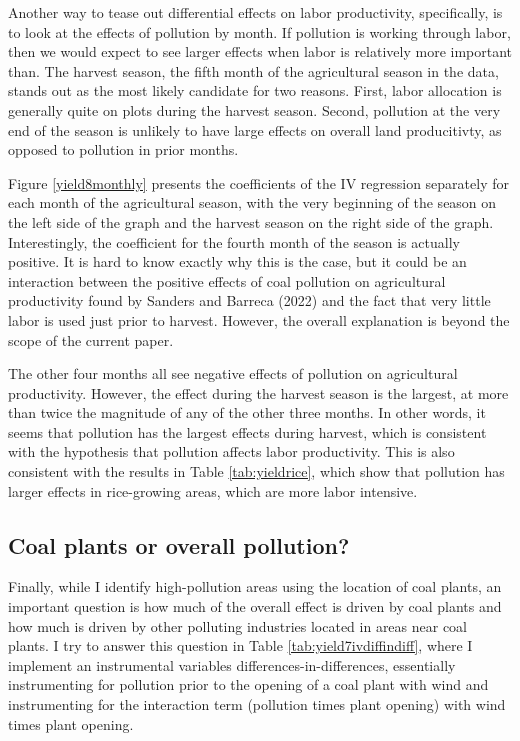 \documentclass[
]{article}
\begin{document}
Another way to tease out differential effects on labor productivity, specifically, is to look at the effects of pollution by month. If pollution is working through labor, then we would expect to see larger effects when labor is relatively more important than. The harvest season, the fifth month of the agricultural season in the data, stands out as the most likely candidate for two reasons. First, labor allocation is generally quite on plots during the harvest season. Second, pollution at the very end of the season is unlikely to have large effects on overall land producitivty, as opposed to pollution in prior months.

Figure \ref{yield8monthly} presents the coefficients of the IV regression separately for each month of the agricultural season, with the very beginning of the season on the left side of the graph and the harvest season on the right side of the graph. Interestingly, the coefficient for the fourth month of the season is actually positive. It is hard to know exactly why this is the case, but it could be an interaction between the positive effects of coal pollution on agricultural productivity found by Sanders and Barreca (2022) and the fact that very little labor is used just prior to harvest. However, the overall explanation is beyond the scope of the current paper.

The other four months all see negative effects of pollution on agricultural productivity. However, the effect during the harvest season is the largest, at more than twice the magnitude of any of the other three months. In other words, it seems that pollution has the largest effects during harvest, which is consistent with the hypothesis that pollution affects labor productivity. This is also consistent with the results in Table \ref{tab:yieldrice}, which show that pollution has larger effects in rice-growing areas, which are more labor intensive.

\hypertarget{coal-plants-or-overall-pollution}{%
\subsection{Coal plants or overall pollution?}\label{coal-plants-or-overall-pollution}}

Finally, while I identify high-pollution areas using the location of coal plants, an important question is how much of the overall effect is driven by coal plants and how much is driven by other polluting industries located in areas near coal plants. I try to answer this question in Table \ref{tab:yield7ivdiffindiff}, where I implement an instrumental variables differences-in-differences, essentially instrumenting for pollution prior to the opening of a coal plant with wind and instrumenting for the interaction term (pollution times plant opening) with wind times plant opening.
\end{document}
